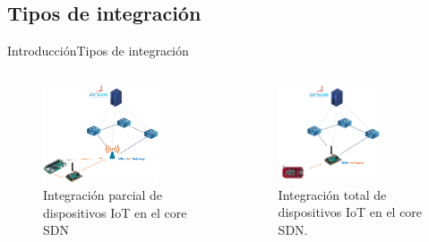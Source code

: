 \documentclass[10pt,compress,xcolor=table]{beamer} %
\begin{document}
\subsection{Tipos de integración}
\begin{frame}{Introducción}{Tipos de integración}

\begin{columns}

  \begin{column}{0.5\textwidth}
    \begin{figure}
      \includegraphics[width=0.8\textwidth]{img/sdn_iot.png}
      \caption{ Integración parcial de dispositivos IoT en el core SDN}
      \label{fig:sdn_iot}
    \end{figure}
        
  \end{column}
  \vrule\hspace{0.4cm}
  \begin{column}{0.5\textwidth}  %
     \begin{figure}
      \includegraphics[width=0.7\textwidth]{img/sdn_iot_b.png}
      \caption{Integración total de dispositivos IoT en el core SDN.}
      \label{fig:sdn_iotb}
    \end{figure}
  \end{column}
  
\end{columns}
\end{frame}
\end{document}
